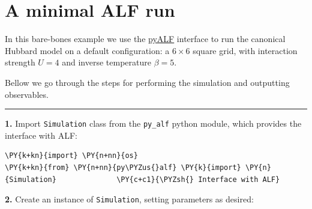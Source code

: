     
    

    
    \hypertarget{a-minimal-alf-run}{%
\section{A minimal ALF run}\label{a-minimal-alf-run}}

    In this bare-bones example we use the
\href{https://git.physik.uni-wuerzburg.de/ALF/pyALF/-/tree/ALF-2.0}{pyALF}
interface to run the canonical Hubbard model on a default configuration:
a \(6\times6\) square grid, with interaction strength \(U=4\) and
inverse temperature \(\beta = 5\).

Bellow we go through the steps for performing the simulation and
outputting observables.

\begin{center}\rule{0.5\linewidth}{\linethickness}\end{center}

\textbf{1.} Import \texttt{Simulation} class from the \texttt{py\_alf}
python module, which provides the interface with ALF:

    \begin{tcolorbox}[breakable, size=fbox, boxrule=1pt, pad at break*=1mm,colback=cellbackground, colframe=cellborder]
\begin{Verbatim}[commandchars=\\\{\}]
\PY{k+kn}{import} \PY{n+nn}{os}
\PY{k+kn}{from} \PY{n+nn}{py\PYZus{}alf} \PY{k}{import} \PY{n}{Simulation}              \PY{c+c1}{\PYZsh{} Interface with ALF}
\end{Verbatim}
\end{tcolorbox}

    \textbf{2.} Create an instance of \texttt{Simulation}, setting
parameters as desired:

